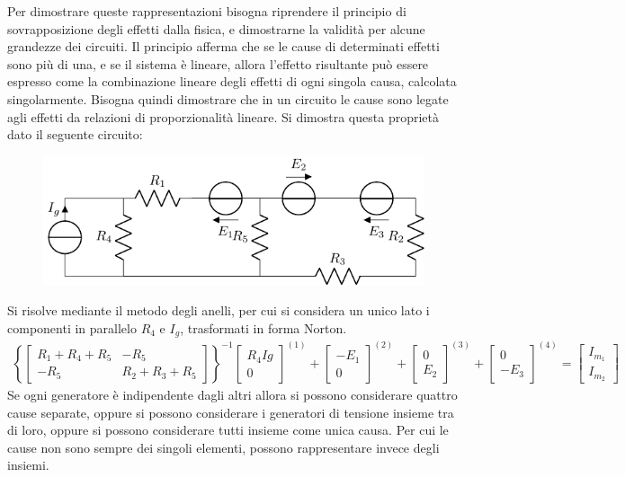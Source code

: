 \documentclass{article}
\numberwithin{equation}{subsection}
\begin{document}
Per dimostrare queste rappresentazioni bisogna riprendere il principio di sovrapposizione degli effetti dalla fisica, e dimostrarne la validità per alcune grandezze dei 
circuiti. Il principio afferma che se le cause di determinati effetti sono più di una, e se il sistema è lineare, allora l'effetto risultante può essere espresso come la 
combinazione lineare degli effetti di ogni singola causa, calcolata singolarmente. 
Bisogna quindi dimostrare che in un circuito le cause sono legate agli effetti da relazioni di proporzionalità lineare. 
Si dimostra questa proprietà dato il seguente circuito:
\begin{figure}[H]%
    \centering
    \includegraphics{circuito-7.pdf}%
    \label{fig:circuito-7}
\end{figure}
Si risolve mediante il metodo degli anelli, per cui si considera un unico lato i componenti in parallelo $R_4$ e $I_g$, trasformati in forma Norton. 
\begin{gather*}
    \left\{\begin{bmatrix}
        R_1+R_4+R_5&-R_5\\
        -R_5&R_2+R_3+R_5
    \end{bmatrix}\right\}^{-1}
            \begin{bmatrix}
                R_4Ig\\
                0
            \end{bmatrix}^{(1)}+
            \begin{bmatrix}
                -E_1\\
                0
            \end{bmatrix}^{(2)}+
            \begin{bmatrix}
                0\\
                E_2
            \end{bmatrix}^{(3)}+
            \begin{bmatrix}
                0\\
                -E_3
            \end{bmatrix}^{(4)}
    =\begin{bmatrix}
        I_{m_1}\\
        I_{m_2}
    \end{bmatrix}
\end{gather*}
Se ogni generatore è indipendente dagli altri allora si possono considerare quattro cause separate, oppure si possono considerare i generatori di tensione insieme tra di loro, 
oppure si possono considerare tutti insieme come unica causa. Per cui le cause non sono sempre dei singoli elementi, possono rappresentare invece degli insiemi. 
\end{document}
